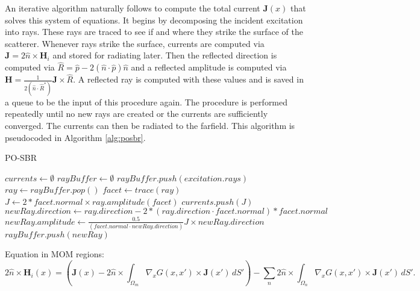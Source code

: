 \documentclass{article}
\theoremstyle{plain}
\begin{document}
An iterative algorithm naturally follows to compute the total current $\mathbf{J}(x)$ that solves this system of equations.
It begins by decomposing the incident excitation into rays.
These rays are traced to see if and where they strike the surface of the scatterer.
Whenever rays strike the surface, currents are computed via $\mathbf{J}=2\hat{n}\times \mathbf{H}_i$
and stored for radiating later.
Then the reflected direction is computed via $\hat{R} = \hat{p} - 2(\hat{n}\cdot\hat{p})\hat{n}$
and a reflected amplitude is computed via $\mathbf{H} = \frac{1}{2\left(\hat{n}\cdot\hat{R}^*\right)}\mathbf{J} \times \hat{R}$.
A reflected ray is computed with these values and is saved in a queue to be the input of this procedure again.
The procedure is performed repeatedly until no new rays are created or the currents are sufficiently converged.
The currents can then be radiated to the farfield. This algorithm is pseudocoded in Algorithm \ref{alg:posbr}.
\begin{algorithm}
\caption{PO-SBR}\label{alg:posbr}
\begin{algorithmic}[1]
\State $currents \gets \emptyset$
\State $rayBuffer \gets \emptyset$
\State $rayBuffer.push( excitation.rays )$
\State $ray \gets rayBuffer.pop()$
\State $facet \gets trace(ray)$
    \State $J \gets 2*facet.normal \times ray.amplitude(facet)$
    \State $currents.push(J)$
    \State $newRay.direction \gets ray.direction - 2*(ray.direction \cdot facet.normal)*facet.normal$
    \State $newRay.amplitude \gets \frac{0.5}{\left(facet.normal\cdot newRay.direction\right)} J \times newRay.direction$
    \State $rayBuffer.push( newRay )$
\EndIf
\EndWhile
\end{algorithmic}
\end{algorithm}


Equation in MOM regions:
\begin{equation}
	2\hat{n}\times\mathbf{H}_i(x)
	= \left( \mathbf{J}(x)
	- 2\hat{n}\times\int_{\Omega_m} \nabla_{x} G(x,x') \times \mathbf{J}(x') \,dS'\right)
	- \sum_n 2\hat{n}\times\int_{\Omega_n} \nabla_{x} G(x,x') \times \mathbf{J}(x') \,dS'.
\end{equation}
\end{document}
